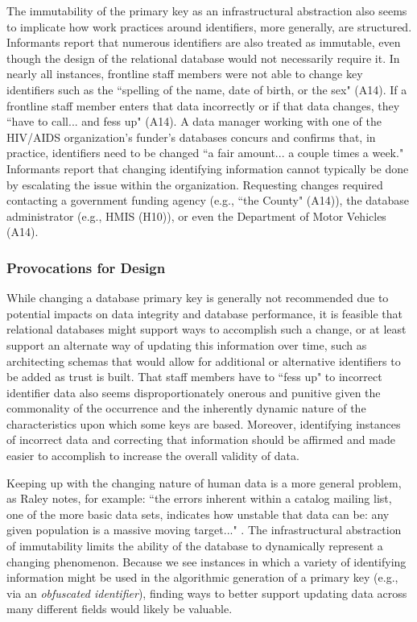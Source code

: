 The immutability of the primary key as an infrastructural abstraction also seems to implicate how work practices around identifiers, more generally, are structured. Informants report that numerous identifiers are also treated as immutable, even though the design of the relational database would not necessarily require it. In nearly all instances, frontline staff members were not able to change key identifiers such as the ``spelling of the name, date of birth, or the sex" (A14). If a frontline staff member enters that data incorrectly or if that data changes, they ``have to call... and fess up" (A14). A data manager working with one of the HIV/AIDS organization's funder's databases concurs and confirms that, in practice, identifiers need to be changed ``a fair amount... a couple times a week." Informants report that changing identifying information cannot typically be done by escalating the issue within the organization. Requesting changes required contacting a government funding agency (e.g., ``the County" (A14)), the database administrator (e.g., HMIS (H10)), or even the Department of Motor Vehicles (A14).

\subsubsection{Provocations for Design}
While changing a database primary key is generally not recommended due to potential impacts on data integrity and database performance, it is feasible that relational databases might support ways to accomplish such a change, or at least support an alternate way of updating this information over time, such as architecting schemas that would allow for additional or alternative identifiers to be added as trust is built. That staff members have to ``fess up" to incorrect identifier data also seems disproportionately onerous and punitive given the commonality of the occurrence and the inherently dynamic nature of the characteristics upon which some keys are based. Moreover, identifying instances of incorrect data and correcting that information should be affirmed and made easier to accomplish to increase the overall validity of data.

Keeping up with the changing nature of human data is a more general problem, as Raley notes, for example: ``the errors inherent within a catalog mailing list, one of the more basic data sets, indicates how unstable that data can be: any given population is a massive moving target..." \citep{Raley2013Dataveillance}. The infrastructural abstraction of immutability limits the ability of the database to dynamically represent a changing phenomenon. Because we see instances in which a variety of identifying information might be used in the algorithmic generation of a primary key (e.g., via an \textit{obfuscated identifier}), finding ways to better support updating data across many different fields would likely be valuable.

